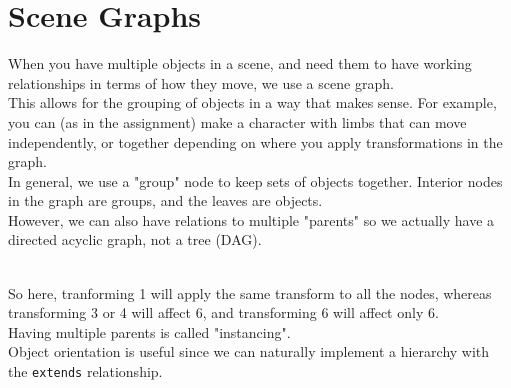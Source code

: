 \documentclass[12pt]{article}
\theoremstyle{definition}
\begin{document}
\section{Scene Graphs}
When you have multiple objects in a scene, and need them to have working relationships in terms of how they move, we use a scene graph. 
\\ \linebreak
This allows for the grouping of objects in a way that makes sense. For example, you can (as in the assignment) make a character with limbs that can move independently, or together depending on where you apply transformations in the graph.
\\ \linebreak
In general, we use a "group" node to keep sets of objects together. Interior nodes in the graph are groups, and the leaves are objects.
\\ \linebreak
However, we can also have relations to multiple "parents" so we actually have a directed acyclic graph, not a tree (DAG).

\\
So here, tranforming 1 will apply the same transform to all the nodes, whereas transforming 3 or 4 will affect 6, and transforming 6 will affect only 6. 
\\ \linebreak
Having multiple parents is called "instancing".
\\ \linebreak
Object orientation is useful since we can naturally implement a hierarchy with the \texttt{extends} relationship.
\end{document}
